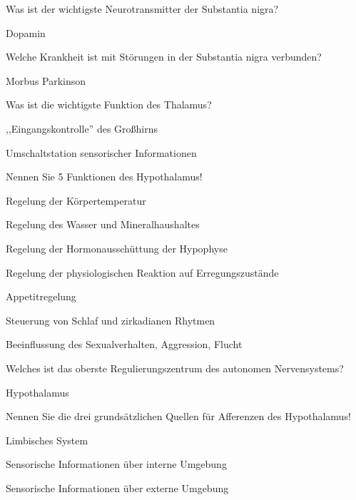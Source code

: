 \documentclass[10pt, a4paper]{exam}
\newcommand\Warning{%
 \makebox[1.4em][c]{%
 \makebox[0pt][c]{\raisebox{.1em}{\small!}}%
 \makebox[0pt][c]{\color{red}\Large$\bigtriangleup$}}}%
\begin{document}
\begin{questions}
  \question Was ist der wichtigste Neurotransmitter der Substantia nigra?
  \begin{solution}
    Dopamin
  \end{solution}

  \question Welche Krankheit ist mit Störungen in der Substantia nigra verbunden?
  \begin{solution}
    Morbus Parkinson \Warning
  \end{solution}

  \question Was ist die wichtigste Funktion des Thalamus?
  \begin{solution}
    \begin{itemize*}
      \item ,,Eingangskontrolle'' des Großhirns
      \item Umschaltstation sensorischer Informationen
    \end{itemize*}
  \end{solution}

  \question Nennen Sie 5 Funktionen des Hypothalamus!
  \begin{solution}
    \begin{itemize*}
      \item Regelung der Körpertemperatur
      \item Regelung des Wasser und Mineralhaushaltes
      \item Regelung der Hormonausschüttung der Hypophyse
      \item Regelung der physiologischen Reaktion auf Erregungszustände
      \item Appetitregelung
      \item Steuerung von Schlaf und zirkadianen Rhytmen
      \item Beeinflussung des Sexualverhalten, Aggression, Flucht
    \end{itemize*}
  \end{solution}

  \question Welches ist das oberste Regulierungszentrum des autonomen Nervensystems?
  \begin{solution}
    Hypothalamus
  \end{solution}

  \question Nennen Sie die drei grundsätzlichen Quellen für Afferenzen des Hypothalamus!
  \begin{solution}
    \begin{itemize*}
      \item Limbisches System
      \item Sensorische Informationen über interne Umgebung
      \item Sensorische Informationen über externe Umgebung
    \end{itemize*}
  \end{solution}


\end{questions}
\end{document}
